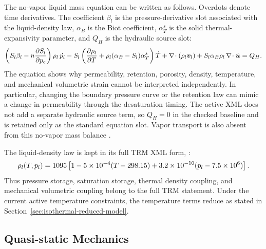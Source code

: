 The no-vapor liquid mass equation can be written as follows.  Overdots denote time
derivatives.  The coefficient \(\beta_l\) is the pressure-derivative slot associated
with the liquid-density law, \(\alpha_B\) is the Biot coefficient, \(\alpha_T^s\) is
the solid thermal-expansivity parameter, and \(Q_H\) is the hydraulic source slot:
\begin{equation}
\left(
  S_l\beta_l
  - n\frac{\partial S_l}{\partial p_c}
\right)\rho_l\,\dot{p_l}
-
S_l
\left(
  \frac{\partial \rho_l}{\partial T}
  + \rho_l(\alpha_B-S_l)\alpha_T^s
\right)\dot{T}
+
\nabla\!\cdot(\rho_l\bm{v}_{l})
+
S_l\alpha_B\rho_l\,\nabla\!\cdot\dot{\bm{u}}
= Q_H .
\label{eq:mass-balance}
\end{equation}
The equation shows why permeability, retention, porosity, density, temperature, and
mechanical volumetric strain cannot be interpreted independently.  In particular,
changing the boundary pressure curve or the retention law can mimic a change in
permeability through the desaturation timing.  The active XML does not add a
separate hydraulic source term, so \(Q_H=0\) in the checked baseline and is retained
only as the standard equation slot.  Vapor transport is also absent from this
no-vapor mass balance \citep[``Governing equations without vapor diffusion'']{OpenGeoSysTRMDocs}.

The liquid-density law is kept in its full TRM XML form,
:
\begin{equation}
  \rho_l(T,p_l)
  =
  1095
  \left[
    1
    -5\times 10^{-4}(T-298.15)
    +3.2\times10^{-10}(p_l-7.5\times10^6)
  \right].
  \label{eq:liquid-density}
\end{equation}
Thus pressure storage, saturation storage, thermal density coupling, and mechanical
volumetric coupling belong to the full TRM statement.   Under the current active
temperature constraints, the temperature terms reduce as stated in
Section~\ref{sec:isothermal-reduced-model}.



\subsection{Quasi-static Mechanics}
\label{sec:mechanics-equation}

